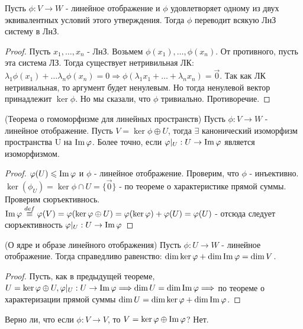 \begin{corollary}
	Пусть $\phi:V\to W$ - линейное отображение и $\phi$ удовлетворяет одному из двух эквивалентных условий этого утверждения. Тогда $\phi$ переводит всякую ЛнЗ систему в ЛнЗ. 
\end{corollary}
\begin{proof}
	Пусть \(x_1, \ldots, x_n\) - ЛнЗ. Возьмем \(\phi(x_1), \ldots, \phi(x_n)\). От противного, пусть эта система ЛЗ. Тогда существует нетривильная ЛК: \(\lambda_1\phi(x_1) + \ldots \lambda_n\phi(x_n) = 0 \Longrightarrow \phi(\lambda_1x_1+\ldots+\lambda_nx_n)=\vec 0\). Так как ЛК нетривиальная, то аргумент будет ненулевым. Но тогда ненулевой вектор принадлежит \(\ker \phi\). Но мы сказали, что $\phi$ тривиально. Противоречие.
\end{proof}
\begin{theorem}
	(Теорема о гомоморфизме для линейных пространств) \newline
	Пусть $\phi:V\to W$ - линейное отображение. Пусть \(V = \ker\phi \oplus U\), тогда $\exists$ канонический изоморфизм пространства U на \(\operatorname{Im} \varphi\). Более точно, если \(\varphi|_{U}:U\to \operatorname{Im}\varphi\) является изоморфизмом.
\end{theorem}
\begin{proof}
	\(\varphi(U)\leqslant \operatorname{Im} \varphi \) и $\phi$ - линейное отображение. Проверим, что $\phi$ - инъективно. \(\ker(\phi_U) = \ker\phi\cap U = \{\vec 0\}\) - по теореме о характеристике прямой суммы. Проверим сюръективнось. \(\operatorname{Im}\varphi\overset{def}{\equiv} \varphi(V) = \varphi(\ker\varphi\oplus U) = \varphi(\ker\varphi) + \varphi(U) = \varphi(U)\) - отсюда следует сюръективность \(\varphi|_U:U\to \operatorname{Im}\varphi\)
\end{proof}
\begin{theorem}
	(О ядре и образе линейного отображения) \newline
	Пусть \(\phi:U\to W\) - линейное отображение. Тогда справедливо равенство: \(\dim \ker\varphi + \dim\operatorname{Im} \varphi = \dim V\).
\end{theorem}
\begin{proof}
	Пусть, как в предыдущей теореме, \(U = \ker\varphi\oplus U, \varphi|_U: U\to \operatorname{Im} \varphi\Longrightarrow \dim U = \dim \operatorname{Im} \varphi\Longrightarrow\) по теореме о характеризации прямой суммы \(\dim U = \dim \ker\varphi+\dim\operatorname{Im}\varphi\). 
\end{proof}
\begin{note}
	Верно ли, что если $\phi:V\to V$, то \(V = \ker\varphi\oplus\operatorname{Im}\varphi\)? Нет.
\end{note}
